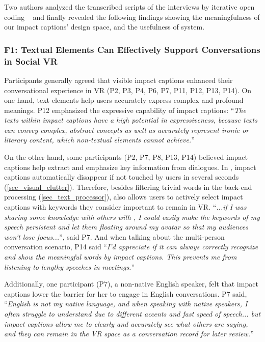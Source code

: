 Two authors analyzed the transcribed scripts of the interviews by iterative open coding ~\cite{corbin2014basics} and finally revealed the following findings showing the meaningfulness of our impact captions' design space, and the usefulness of \system{} system.


\subsubsection{F1: Textual Elements Can Effectively Support Conversations in Social VR}
\label{finding_text}
Participants generally agreed that visible impact captions enhanced their conversational experience in VR (P2, P3, P4, P6, P7, P11, P12, P13, P14). 
On one hand, text elements help users accurately express complex and profound meanings. P12 emphasized the expressive capability of impact captions: ``\textit{The texts within impact captions have a high potential in expressiveness, because texts can convey complex, abstract concepts as well as accurately represent ironic or literary content, which non-textual elements cannot achieve.}''

On the other hand, some participants (P2, P7, P8, P13, P14) believed impact captions help extract and emphasize key information from dialogues. 
In \system{}, impact captions automatically disappear if not touched by users in several seconds (\autoref{sec_visual_clutter}). Therefore, besides filtering trivial words in the back-end processing (\autoref{sec_text_processor}), \system{} also allows users to actively select impact captions with keywords they consider important to remain in VR. ``\textit{...if I was sharing some knowledge with others with \system{}, I could easily make the keywords of my speech persistent and let them floating around my avatar so that my audiences won't lose focus...}'', said P7. 
And when talking about the multi-person conversation scenario, P14 said ``\textit{I'd appreciate \system{} if it can always correctly recognize and show the meaningful words by impact captions. This prevents me from listening to lengthy speeches in meetings.}''

Additionally, one participant (P7), a non-native English speaker, felt that impact captions lower the barrier for her to engage in English conversations. P7 said, ``\textit{English is not my native language, and when speaking with native speakers, I often struggle to understand due to different accents and fast speed of speech... but impact captions allow me to clearly and accurately see what others are saying, and they can remain in the VR space as a conversation record for later review.}''



